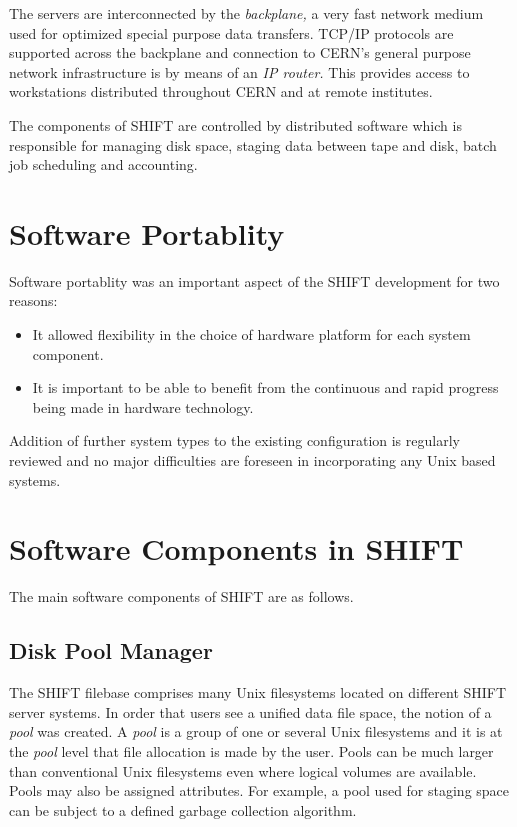 The servers are interconnected by the
{\em backplane,}
a very fast network medium used for optimized special purpose data transfers.
TCP/IP protocols are supported across the backplane
and connection to CERN's general
purpose network infrastructure is by means of an
{\em IP router.}
This provides access to workstations distributed throughout CERN and
at remote institutes.
 
The components of SHIFT are controlled by distributed software which is
responsible for managing disk space, staging data between tape and
disk, batch job scheduling and accounting.
 
\section {Software Portablity}
 
Software portablity was an important aspect of the SHIFT development for
two reasons:
\begin {itemize}
\item
It allowed flexibility in the choice of hardware platform
for each system component.
\item
It is important to be able to benefit
from the continuous and rapid progress being made in hardware technology.
\end {itemize}
 
Addition of further system types to the existing configuration is
regularly reviewed and no major difficulties are foreseen in incorporating any
Unix based systems.
 
\section {Software Components in SHIFT}
 
The main software components of SHIFT are as follows.
 
\subsection {Disk Pool Manager}
 
The SHIFT filebase comprises many Unix filesystems located
on different SHIFT server systems.
In order that users see a unified data file space,
the notion of a
{\em pool}
was created. A
{\em pool}
is a group of one or several Unix filesystems and it is at the
{\em pool}
level that file allocation is made by the user.
Pools can be much larger than conventional Unix filesystems
even where logical volumes are available. Pools may also
be assigned attributes. For example, a pool used for staging space
can be subject to a defined garbage collection algorithm.
 
